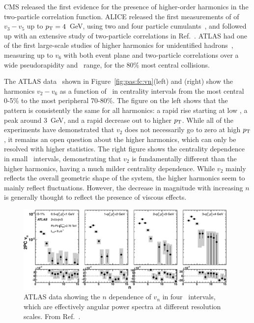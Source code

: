 CMS released the first evidence for the presence of higher-order harmonics in the two-particle
correlation function.  ALICE released the first measurements of of $v_3-v_5$ up to $\mbox{$p_{\mathrm{T}}$}=4$~GeV,
using two and four particle cumulants~\cite{ALICE:2011ab}, and followed up with an extensive study of two-particle
correlations in Ref.~\cite{Aamodt:2011by}.
ATLAS had one of the first large-scale studies of higher harmonics
for unidentified hadrons~\cite{ATLAS:2012at}, measuring up to $v_6$ with both event plane
and two-particle correlations over a wide pseudorapidity and \pT\
range, for the 80\% most central collisions.

The ATLAS data~\cite{ATLAS:2012at} shown in
Figure~\ref{fig:pas:fc:vn}(left) and (right) show the harmonics $v_2 -
v_6$ as a function of \pT\ in centrality intervals from the most
central 0-5\% to the most peripheral 70-80\%.  The figure on the
left shows that the pattern is consistently the same for all
harmonics: a rapid rise starting at low \pT, a peak around 3~GeV, and
a rapid decrease out to higher $\mbox{$p_{\mathrm{T}}$}$.  While all of the experiments
have demonstrated that $v_2$ does not necessarily go to zero at high
$\mbox{$p_{\mathrm{T}}$}$, it remains an open question about the higher harmonics, which
can only be resolved with higher statistics.  The right figure shows
the centrality dependence in small \pT\ intervals, demonstrating that
$v_2$ is fundamentally different than the higher harmonics, having a
much milder centrality dependence.  While $v_2$ mainly reflects the
overall geometric shape of the system, the higher harmonics seem to
mainly reflect fluctuations.  However, the decrease in magnitude with
increasing $n$ is generally thought to reflect the presence of viscous
effects.

\begin{figure}[!tb]
\begin{center}
\includegraphics[width=0.98\textwidth]{flowcorrelations_figs/atlas_vn_fig_13.pdf}
\caption[]{
ATLAS data showing the $n$ dependence of $v_n$ in four \pT\ intervals, which are effectively
angular power spectra at different resolution scales.  From Ref.~\cite{ATLAS:2012at}.
}
\label{fig:pas:fc:powerspec}
\end{center}
\end{figure}

